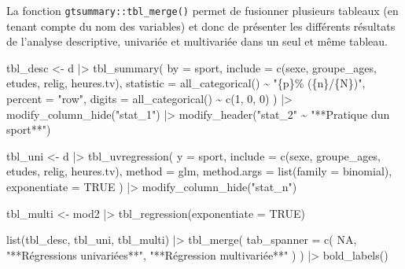 \documentclass[
  letterpaper,
  DIV=11,
  numbers=noendperiod,
  oneside]{scrreprt}
\newenvironment{Shaded}{\begin{snugshade}}{\end{snugshade}}
\newcommand{\AttributeTok}[1]{\textcolor[rgb]{0.40,0.45,0.13}{#1}}
\newcommand{\ConstantTok}[1]{\textcolor[rgb]{0.56,0.35,0.01}{#1}}
\newcommand{\DecValTok}[1]{\textcolor[rgb]{0.68,0.00,0.00}{#1}}
\newcommand{\FunctionTok}[1]{\textcolor[rgb]{0.28,0.35,0.67}{#1}}
\newcommand{\NormalTok}[1]{\textcolor[rgb]{0.00,0.23,0.31}{#1}}
\newcommand{\OtherTok}[1]{\textcolor[rgb]{0.00,0.23,0.31}{#1}}
\newcommand{\SpecialCharTok}[1]{\textcolor[rgb]{0.37,0.37,0.37}{#1}}
\newcommand{\StringTok}[1]{\textcolor[rgb]{0.13,0.47,0.30}{#1}}
\begin{document}
La fonction \texttt{gtsummary::tbl\_merge()} permet de fusionner
plusieurs tableaux (en tenant compte du nom des variables) et donc de
présenter les différents résultats de l'analyse descriptive, univariée
et multivariée dans un seul et même tableau.

\begin{Shaded}
\begin{Highlighting}[]
\NormalTok{tbl\_desc }\OtherTok{\textless{}{-}}
\NormalTok{  d }\SpecialCharTok{|\textgreater{}} 
  \FunctionTok{tbl\_summary}\NormalTok{(}
    \AttributeTok{by =}\NormalTok{ sport,}
    \AttributeTok{include =} \FunctionTok{c}\NormalTok{(sexe, groupe\_ages, etudes, relig, heures.tv),}
    \AttributeTok{statistic =} \FunctionTok{all\_categorical}\NormalTok{() }\SpecialCharTok{\textasciitilde{}} \StringTok{"\{p\}\% (\{n\}/\{N\})"}\NormalTok{,}
    \AttributeTok{percent =} \StringTok{"row"}\NormalTok{,}
    \AttributeTok{digits =} \FunctionTok{all\_categorical}\NormalTok{() }\SpecialCharTok{\textasciitilde{}} \FunctionTok{c}\NormalTok{(}\DecValTok{1}\NormalTok{, }\DecValTok{0}\NormalTok{, }\DecValTok{0}\NormalTok{)}
\NormalTok{  ) }\SpecialCharTok{|\textgreater{}} 
  \FunctionTok{modify\_column\_hide}\NormalTok{(}\StringTok{"stat\_1"}\NormalTok{) }\SpecialCharTok{|\textgreater{}} 
  \FunctionTok{modify\_header}\NormalTok{(}\StringTok{"stat\_2"} \SpecialCharTok{\textasciitilde{}} \StringTok{"**Pratique d\textquotesingle{}un sport**"}\NormalTok{)}

\NormalTok{tbl\_uni }\OtherTok{\textless{}{-}}
\NormalTok{  d }\SpecialCharTok{|\textgreater{}}
  \FunctionTok{tbl\_uvregression}\NormalTok{(}
    \AttributeTok{y =}\NormalTok{ sport,}
    \AttributeTok{include =} \FunctionTok{c}\NormalTok{(sexe, groupe\_ages, etudes, relig, heures.tv),}
    \AttributeTok{method =}\NormalTok{ glm,}
    \AttributeTok{method.args =} \FunctionTok{list}\NormalTok{(}\AttributeTok{family =}\NormalTok{ binomial),}
    \AttributeTok{exponentiate =} \ConstantTok{TRUE}
\NormalTok{  ) }\SpecialCharTok{|\textgreater{}} 
  \FunctionTok{modify\_column\_hide}\NormalTok{(}\StringTok{"stat\_n"}\NormalTok{)}

\NormalTok{tbl\_multi }\OtherTok{\textless{}{-}}
\NormalTok{  mod2 }\SpecialCharTok{|\textgreater{}} 
  \FunctionTok{tbl\_regression}\NormalTok{(}\AttributeTok{exponentiate =} \ConstantTok{TRUE}\NormalTok{)}

\FunctionTok{list}\NormalTok{(tbl\_desc, tbl\_uni, tbl\_multi) }\SpecialCharTok{|\textgreater{}} 
  \FunctionTok{tbl\_merge}\NormalTok{(}
    \AttributeTok{tab\_spanner =} \FunctionTok{c}\NormalTok{(}
      \ConstantTok{NA}\NormalTok{,}
      \StringTok{"**Régressions univariées**"}\NormalTok{,}
      \StringTok{"**Régression multivariée**"}
\NormalTok{    )}
\NormalTok{  ) }\SpecialCharTok{|\textgreater{}} 
  \FunctionTok{bold\_labels}\NormalTok{()}
\end{Highlighting}
\end{Shaded}
\end{document}
